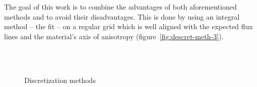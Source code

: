 The goal of this work is to combine the advantages of both
aforementioned methods and to avoid their disadvantages.  This is done
by using an integral method -- the \gls{fit} -- on a regular grid which is
well aligned with the expected flux lines and the material's axis of
anisotropy (figure~\ref{fig:descret-meth-3}).
\begin{figure}
  \centering
  \\ \bigskip
  \\ \bigskip
  \caption{Discretization methods}
  \label{fig:descret-meth}
\end{figure}

